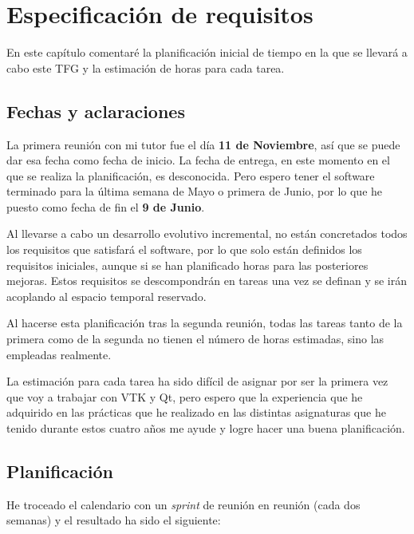 \chapter{Especificación de requisitos}

En este capítulo comentaré la planificación inicial de tiempo en la que se llevará a cabo este TFG y la estimación de horas para cada tarea.

\section{Fechas y aclaraciones}

La primera reunión con mi tutor fue el día \textbf{11 de Noviembre}, así que se puede dar esa fecha como fecha de inicio. La fecha de entrega, en este momento en el que se realiza la planificación, es desconocida. Pero espero tener el software terminado para la última semana de Mayo o primera de Junio, por lo que he puesto como fecha de fin el \textbf{9 de Junio}.

Al llevarse a cabo un desarrollo evolutivo incremental, no están concretados todos los requisitos que satisfará el software, por lo que solo están definidos los requisitos iniciales, aunque si se han planificado horas para las posteriores mejoras. Estos requisitos se descompondrán en tareas una vez se definan y se irán acoplando al espacio temporal reservado.

Al hacerse esta planificación tras la segunda reunión, todas las tareas tanto de la primera como de la segunda no tienen el número de horas estimadas, sino las empleadas realmente.

La estimación para cada tarea ha sido difícil de asignar por ser la primera vez que voy a trabajar con VTK y Qt, pero espero que la experiencia que he adquirido en las prácticas que he realizado en las distintas asignaturas que he tenido durante estos cuatro años me ayude y logre hacer una buena planificación.

\section{Planificación}

He troceado el calendario con un \textit{sprint} de reunión en reunión (cada dos semanas) y el resultado ha sido el siguiente:

